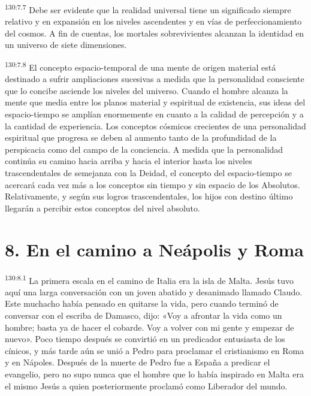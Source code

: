 \par
\textsuperscript{130:7.7} Debe ser evidente que la realidad universal tiene un significado siempre relativo y en expansión en los niveles ascendentes y en vías de perfeccionamiento del cosmos. A fin de cuentas, los mortales sobrevivientes alcanzan la identidad en un universo de siete dimensiones.

\par
\textsuperscript{130:7.8} El concepto espacio-temporal de una mente de origen material está destinado a sufrir ampliaciones sucesivas a medida que la personalidad consciente que lo concibe asciende los niveles del universo. Cuando el hombre alcanza la mente que media entre los planos material y espiritual de existencia, sus ideas del espacio-tiempo se amplían enormemente en cuanto a la calidad de percepción y a la cantidad de experiencia. Los conceptos cósmicos crecientes de una personalidad espiritual que progresa se deben al aumento tanto de la profundidad de la perspicacia como del campo de la conciencia. A medida que la personalidad continúa su camino hacia arriba y hacia el interior hasta los niveles trascendentales de semejanza con la Deidad, el concepto del espacio-tiempo se acercará cada vez más a los conceptos sin tiempo y sin espacio de los Absolutos. Relativamente, y según sus logros trascendentales, los hijos con destino último llegarán a percibir estos conceptos del nivel absoluto.

\section*{8. En el camino a Neápolis y Roma}
\par
\textsuperscript{130:8.1} La primera escala en el camino de Italia era la isla de Malta. Jesús tuvo aquí una larga conversación con un joven abatido y desanimado llamado Claudo. Este muchacho había pensado en quitarse la vida, pero cuando terminó de conversar con el escriba de Damasco, dijo: «Voy a afrontar la vida como un hombre; basta ya de hacer el cobarde. Voy a volver con mi gente y empezar de nuevo». Poco tiempo después se convirtió en un predicador entusiasta de los cínicos, y más tarde aún se unió a Pedro para proclamar el cristianismo en Roma y en Nápoles. Después de la muerte de Pedro fue a España a predicar el evangelio, pero no supo nunca que el hombre que lo había inspirado en Malta era el mismo Jesús a quien posteriormente proclamó como Liberador del mundo.

